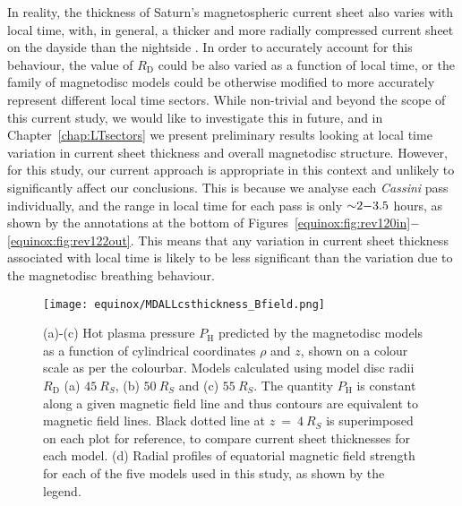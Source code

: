 In reality, the thickness of Saturn's magnetospheric current sheet also varies with local time, with, in general, a thicker and more radially compressed current sheet on the dayside than the nightside \citep[e.g.][]{arridge2008}. In order to accurately account for this behaviour, the value of $R_\mathrm{D}$ could be also varied as a function of local time, or the family of magnetodisc models could be otherwise modified to more accurately represent different local time sectors. While non-trivial and beyond the scope of this current study, we would like to investigate this in future, and in Chapter~\ref{chap:LTsectors} we present preliminary results looking at local time variation in current sheet thickness and overall magnetodisc structure. However, for this study, our current approach is appropriate in this context and unlikely to significantly affect our conclusions. This is because we analyse each \textit{Cassini} pass individually, and the range in local time for each pass is only ${\sim}2{\--}3.5$ hours, as shown by the annotations at the bottom of Figures~\ref{equinox:fig:rev120in}${\--}$\ref{equinox:fig:rev122out}. This means that any variation in current sheet thickness associated with local time is likely to be less significant than the variation due to the magnetodisc breathing behaviour.
\begin{figure}
\centering
\texttt{[image: equinox/MDALLcsthickness\_Bfield.png]}
\caption[Magnetic field structure for $R_\mathrm{D}$ = $45, 50$ and $\SI{55}{R_S}$ magnetodisc models.]{(a)-(c) Hot plasma pressure $P_\mathrm{H}$ predicted by the magnetodisc models as a function of cylindrical coordinates $\rho$ and $z$, shown on a colour scale as per the colourbar. Models calculated using model disc radii $R_\mathrm{D}$ (a) $\SI{45}{R_S}$, (b) $\SI{50}{R_S}$ and (c) $\SI{55}{R_S}$. The quantity $P_\mathrm{H}$ is constant along a given magnetic field line and thus contours are equivalent to magnetic field lines. Black dotted line at $z~{=}~\SI{4}{R_S}$ is superimposed on each plot for reference, to compare current sheet thicknesses for each model. (d) Radial profiles of equatorial magnetic field strength for each of the five models used in this study, as shown by the legend.}
\label{equinox:fig:MDALLcsthickness}
\end{figure}

